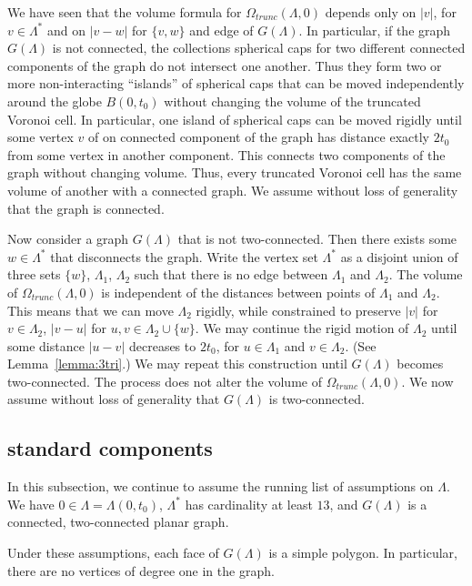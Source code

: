 We have seen that the volume formula for $\Omega_{trunc}(\Lambda,0)$
depends only on $|v|$, for $v\in\Lambda^*$ and on
$|v-w|$ for $\{v,w\}$ and edge of $G(\Lambda)$.
In particular, if the graph $G(\Lambda)$ is not connected, the
collections spherical caps for two different connected components
of the graph do not intersect one another.  Thus they form
two or more non-interacting ``islands'' of spherical caps that
can be moved independently around the globe $B(0,t_0)$
without changing the volume of
the truncated Voronoi cell.  In particular, one island of spherical
caps can be moved rigidly until some vertex $v$ of on connected
component of the graph has distance exactly $2t_0$ from some
vertex in another component.  This connects two components of the
graph without changing volume.  Thus, every truncated Voronoi cell
has the same volume of another with a connected graph.  We
assume without loss of generality that the graph is connected.

Now consider a graph $G(\Lambda)$ that is not two-connected.
Then there exists some $w\in \Lambda^*$ that disconnects
the graph.  Write the vertex set $\Lambda^*$
as a disjoint union of three sets
$\{w\}$, $\Lambda_1$, $\Lambda_2$ such that there is no edge between
$\Lambda_1$ and $\Lambda_2$.  The volume of $\Omega_{trunc}(\Lambda,0)$
is independent of the distances between points of $\Lambda_1$ and
$\Lambda_2$.  This means that we can move $\Lambda_2$ rigidly,
while constrained to preserve $|v|$ for $v\in\Lambda_2$, $|v-u|$
for $u,v\in \Lambda_2\cup\{w\}$. 
We may continue the rigid motion of $\Lambda_2$ until some distance
$|u-v|$ decreases to $2t_0$, for
$u\in\Lambda_1$ and $v\in\Lambda_2$. (See Lemma~\ref{lemma:3tri}.) 
We may repeat this construction until $G(\Lambda)$ becomes two-connected.  The process does not alter the volume of $\Omega_{trunc}(\Lambda,0)$.
We now assume without loss of generality that $G(\Lambda)$ is
two-connected.



\subsection{standard components}

In this subsection, we continue to assume 
the running list of assumptions on $\Lambda$.  We have
$0\in\Lambda = \Lambda(0,t_0)$, $\Lambda^*$ has cardinality
at least $13$, and $G(\Lambda)$ is a connected,
two-connected planar graph.

Under these assumptions, each face of $G(\Lambda)$ is a simple
polygon.  In particular, there are no vertices of degree one 
in the graph.

